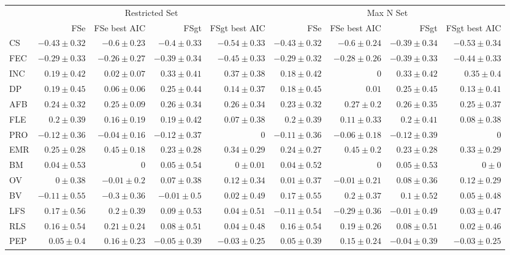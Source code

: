 \begin{landscape}
\begin{table}
\begin{footnotesize}
\begin{tabular}{@{}l|rrrr|rrrr@{}}
\toprule
  & \multicolumn{4}{c|}{Restricted Set} & \multicolumn{4}{c}{Max N Set}\\
  & FSe & FSe best AIC & FSgt & FSgt best AIC & FSe & FSe best AIC & FSgt & FSgt best AIC\\
\midrule
CS & $-0.43 \pm 0.32$ & $-0.6 \pm 0.23$ & $-0.4 \pm 0.33$ & $-0.54 \pm 0.33$ & $-0.43 \pm 0.32$ & $-0.6 \pm 0.24$ & $-0.39 \pm 0.34$ & $-0.53 \pm 0.34$\\
FEC & $-0.29 \pm 0.33$ & $-0.26 \pm 0.27$ & $-0.39 \pm 0.34$ & $-0.45 \pm 0.33$ & $-0.29 \pm 0.32$ & $-0.28 \pm 0.26$ & $-0.39 \pm 0.33$ & $-0.44 \pm 0.33$\\
INC & $0.19 \pm 0.42$ & $0.02 \pm 0.07$ & $0.33 \pm 0.41$ & $0.37 \pm 0.38$ & $0.18 \pm 0.42$ & $0$ & $0.33 \pm 0.42$ & $0.35 \pm 0.4$\\
DP & $0.19 \pm 0.45$ & $0.06 \pm 0.06$ & $0.25 \pm 0.44$ & $0.14 \pm 0.37$ & $0.18 \pm 0.45$ & $0.01$ & $0.25 \pm 0.45$ & $0.13 \pm 0.41$\\
AFB & $0.24 \pm 0.32$ & $0.25 \pm 0.09$ & $0.26 \pm 0.34$ & $0.26 \pm 0.34$ & $0.23 \pm 0.32$ & $0.27 \pm 0.2$ & $0.26 \pm 0.35$ & $0.25 \pm 0.37$\\
FLE & $0.2 \pm 0.39$ & $0.16 \pm 0.19$ & $0.19 \pm 0.42$ & $0.07 \pm 0.38$ & $0.2 \pm 0.39$ & $0.11 \pm 0.33$ & $0.2 \pm 0.41$ & $0.08 \pm 0.38$\\
PRO & $-0.12 \pm 0.36$ & $-0.04 \pm 0.16$ & $-0.12 \pm 0.37$ & $0$ & $-0.11 \pm 0.36$ & $-0.06 \pm 0.18$ & $-0.12 \pm 0.39$ & $0$\\
EMR & $0.25 \pm 0.28$ & $0.45 \pm 0.18$ & $0.23 \pm 0.28$ & $0.34 \pm 0.29$ & $0.24 \pm 0.27$ & $0.45 \pm 0.2$ & $0.23 \pm 0.28$ & $0.33 \pm 0.29$\\
BM & $0.04 \pm 0.53$ & $0$ & $0.05 \pm 0.54$ & $0 \pm 0.01$ & $0.04 \pm 0.52$ & $0$ & $0.05 \pm 0.53$ & $0 \pm 0$\\
OV & $0 \pm 0.38$ & $-0.01 \pm 0.2$ & $0.07 \pm 0.38$ & $0.12 \pm 0.34$ & $0.01 \pm 0.37$ & $-0.01 \pm 0.21$ & $0.08 \pm 0.36$ & $0.12 \pm 0.29$\\
BV & $-0.11 \pm 0.55$ & $-0.3 \pm 0.36$ & $-0.01 \pm 0.5$ & $0.02 \pm 0.49$ & $0.17 \pm 0.55$ & $0.2 \pm 0.37$ & $0.1 \pm 0.52$ & $0.05 \pm 0.48$\\
LFS & $0.17 \pm 0.56$ & $0.2 \pm 0.39$ & $0.09 \pm 0.53$ & $0.04 \pm 0.51$ & $-0.11 \pm 0.54$ & $-0.29 \pm 0.36$ & $-0.01 \pm 0.49$ & $0.03 \pm 0.47$\\
RLS & $0.16 \pm 0.54$ & $0.21 \pm 0.24$ & $0.08 \pm 0.51$ & $0.04 \pm 0.48$ & $0.16 \pm 0.54$ & $0.19 \pm 0.26$ & $0.08 \pm 0.51$ & $0.02 \pm 0.46$\\
PEP & $0.05 \pm 0.4$ & $0.16 \pm 0.23$ & $-0.05 \pm 0.39$ & $-0.03 \pm 0.25$ & $0.05 \pm 0.39$ & $0.15 \pm 0.24$ & $-0.04 \pm 0.39$ & $-0.03 \pm 0.25$\\
\bottomrule
\end{tabular}

\end{footnotesize}
\end{table}
\end{landscape}


